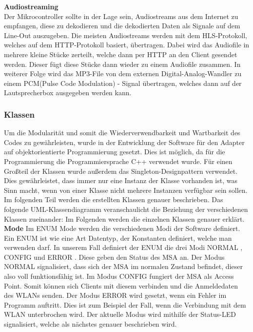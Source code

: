 \documentclass[11pt, twoside]{article}
\begin{document}
\textbf{Audiostreaming} \\
Der Mikrocontroller sollte in der Lage sein, Audiostreams aus dem Internet zu empfangen, diese zu dekodieren und die dekodierten Daten als Signale auf dem Line-Out auszugeben. Die meisten Audiostreams werden mit dem HLS-Protokoll, welches auf dem HTTP-Protokoll basiert, übertragen. Dabei wird das Audiofile in mehrere kleine Stücke zerteilt, welche dann per HTTP an den Client gesendet werden. Dieser fügt diese Stücke dann wieder zu einem Audiofile zusammen. In weiterer Folge wird das MP3-File von dem externen Digital-Analog-Wandler zu einem PCM(Pulse Code Modulation) - Signal übertragen, welches dann auf der Lautsprecherbox ausgegeben werden kann.
\subsubsection{Klassen}
Um die Modularität und somit die Wiederverwendbarkeit und Wartbarkeit des Codes zu gewährleisten, wurde in der Entwicklung der Software für den Adapter auf objektorientierte Programmierung gesetzt. Dies ist möglich, da für die Programmierung die Programmiersprache C++ verwendet wurde. Für einen Großteil der Klassen wurde außerdem das Singleton-Designpattern verwendet. Dies gewährleistet, dass immer nur eine Instanz der Klasse vorhanden ist, was Sinn macht, wenn von einer Klasse nicht mehrere Instanzen verfügbar sein sollen. \parencite[vgl.][]{noauthor_urlpi14_nodate} Im folgenden Teil werden die erstellten Klassen genauer beschrieben. Das folgende UML-Klassendiagramm veranschaulicht die Beziehung der verschiedenen Klassen zueinander:
\newline
Im Folgenden werden die einzelnen Klassen genauer erklärt.
\textbf{Mode} \newline
Im ENUM \glqq Mode \grqq{} werden die verschiedenen Modi der Software definiert. Ein ENUM ist wie eine Art Datentyp, der Konstanten definiert, welche man verwenden darf. \parencite[vgl.][]{noauthor_urlpi15_nodate} In unserem Fall definiert der ENUM die drei Modi \glqq NORMAL \grqq{}, \glqq CONFIG \grqq{} und \glqq ERROR \grqq{}. Diese geben den Status des MSA an. Der Modus \glqq NORMAL \grqq{} signalisiert, dass sich der MSA im normalen Zustand befindet, dieser also voll funktionsfähig ist. Im Modus \glqq CONFIG \grqq{} fungiert der MSA als Access Point. Somit können sich Clients mit diesem verbinden und die Anmeldedaten des WLANs senden. Der Modus \glqq ERROR \grqq{} wird gesetzt, wenn ein Fehler im Programm auftritt. Dies ist zum Beispiel der Fall, wenn die Verbindung mit dem WLAN unterbrochen wird. Der aktuelle Modus wird mithilfe der Status-LED signalisiert, welche als nächstes genauer beschrieben wird. \newline \\
\end{document}
